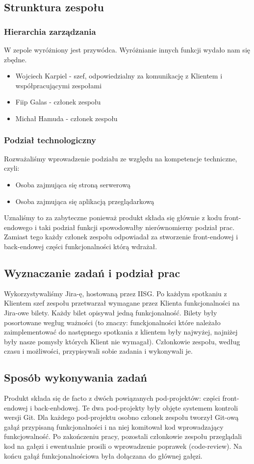 \documentclass[polish,12pt]{aghthesis}
\begin{document}
\subsection{Strunktura zespołu}
\subsubsection{Hierarchia zarządzania}
W zepole wyróżniony jest przywódca. Wyróżnianie innych funkcji wydało nam się zbędne.
\begin{itemize}
    \item Wojciech Karpiel - szef, odpowiedzialny za komunikację z Klientem i współpracującymi zespołami
    \item Fiip Galas - członek zespołu
    \item Michał Hamuda - członek zespołu
\end{itemize}
\subsubsection{Podział technologiczny}
Rozważaliśmy wprowadzenie podziału ze względu na kompetencje techniczne, czyli:
\begin{itemize}
    \item Osoba zajmująca się stroną serwerową
    \item Osoba zajmująca się aplikacją przeglądarkową
\end{itemize}
Uznaliśmy to za zabyteczne ponieważ produkt składa się głównie z kodu front-endowego i taki podział funkcji spowodowałby nierównomierny podział prac. Zamiast tego każdy członek zespołu odpowiadał za stworzenie front-endowej i back-endowej części funkcjonalności którą wdrażał.

\subsection{Wyznaczanie zadań i podział prac}
Wykorzystywaliśmy Jira-ę, hostowaną przez IISG. Po każdym spotkaniu z Klientem szef zespołu przetwarzał wymagane przez Klienta funkcjonalności na Jira-owe bilety. Każdy bilet opisywał jedną funkcjonalność. Bilety były posortowane wegług ważności (to znaczy: funckjonalności które należało zaimplementować do następnego spotkania z klientem były najwyżej, najniżej były nasze pomysły których Klient nie wymagał). Członkowie zespołu, według czasu i możliwości, przypisywali sobie zadania i wykonywali je.

\subsection{Sposób wykonywania zadań}
Produkt składa się de facto z dwóch powiązanych pod-projektów: części front-endowej i back-enbdowej. Te dwa pod-projekty były objęte systemem kontroli wersji Git. Dla każdego pod-projektu osobno członek zespołu tworzył Git-ową gałąź przypisaną funkcjonalności i na niej komitował kod wprowadzający funkcjowalność. Po zakończeniu pracy, pozostali członkowie zespołu przeglądali kod na gałęzi i ewentualnie prosili o wprowadzenie poprawek (code-review). Na końcu gałąź funkcjonalnościowa była dołączana do głównej gałęzi.
\end{document}
